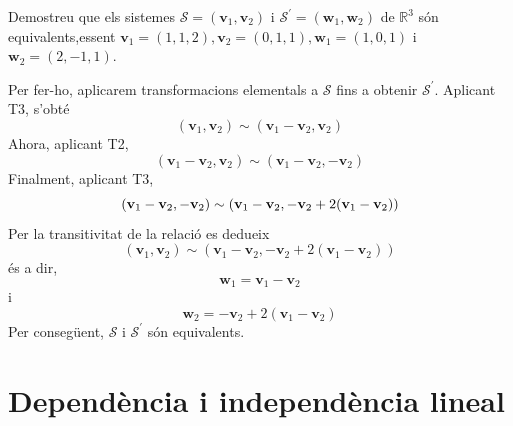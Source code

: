 \begin{exemple}
Demostreu que els sistemes $\mathcal{S}=(\mathbf{v}_{1},\mathbf{v}_{2})$ i $%
\mathcal{S}^{\prime }=(\mathbf{w}_{1},\mathbf{w}_{2})$ de $\mathbb{R}^{3}$
són equivalents,essent $\mathbf{v}_{1}=(1,1,2),\mathbf{v}_{2}=(0,1,1),%
\mathbf{w}_{1}=(1,0,1)$ i $\mathbf{w}_{2}=(2,-1,1)$.

\end{exemple}
\begin{solucio}
Per fer-ho, aplicarem transformacions elementals a $\mathcal{S}$ fins a
obtenir $\mathcal{S}^{\prime }$. Aplicant T3, s’obté%
\begin{equation*}
(\mathbf{v}_{1},\mathbf{v}_{2})\sim (\mathbf{v}_{1}-\mathbf{v}_{2},\mathbf{v}%
_{2})
\end{equation*}%
Ahora, aplicant T2, 
\begin{equation*}
(\mathbf{v}_{1}-\mathbf{v}_{2},\mathbf{v}_{2})\sim (\mathbf{v}_{1}-\mathbf{v}%
_{2},-\mathbf{v}_{2})
\end{equation*}%
Finalment, aplicant T3,%
\begin{equation*}
(\mathbf{v}_{1}-\mathbf{v}_{2},-\mathbf{v}_{2})\sim (\mathbf{v}_{1}-\mathbf{%
v}_{2},-\mathbf{v}_{2}+2(\mathbf{v}_{1}-\mathbf{v}_{2}))
\end{equation*}%
Per la transitivitat de la relació es dedueix%
\begin{equation*}
(\mathbf{v}_{1},\mathbf{v}_{2})\sim (\mathbf{v}_{1}-\mathbf{v}_{2},-\mathbf{v%
}_{2}+2(\mathbf{v}_{1}-\mathbf{v}_{2}))
\end{equation*}%
és a dir,%
\begin{equation*}
\mathbf{w}_{1}=\mathbf{v}_{1}-\mathbf{v}_{2}
\end{equation*}%
i%
\begin{equation*}
\mathbf{w}_{2}=-\mathbf{v}_{2}+2(\mathbf{v}_{1}-\mathbf{v}_{2})
\end{equation*}%
Per consegüent, $\mathcal{S}$ i $\mathcal{S}^{\prime }$ són equivalents.
\end{solucio}

\section{Dependència i independència lineal}

